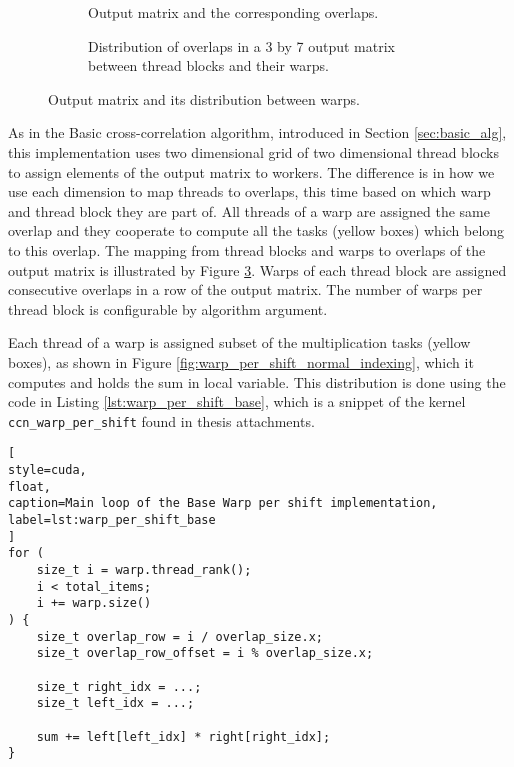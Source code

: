 \begin{figure}[ht]
	\centering	
	\begin{subfigure}{0.55\textwidth}
		\fontsize{6}{8}\selectfont
		\centering
		\def\svgwidth{\textwidth}
		
		\caption{Output matrix and the corresponding overlaps.}
		\label{fig:warp_per_shift_overlaps}
	\end{subfigure}
	\hfill
	\begin{subfigure}{0.4\textwidth}
		\centering
		\def\svgwidth{\textwidth}
		\fontsize{6}{8}\selectfont
		
		\caption{Distribution of overlaps in a 3 by 7 output matrix between thread blocks and their warps.}
		\label{fig:warp_per_shift_warps}
	\end{subfigure}
	
	\caption{Output matrix and its distribution between warps.}
\end{figure}

As in the Basic cross-correlation algorithm, introduced in Section \ref{sec:basic_alg}, this implementation uses two dimensional grid of two dimensional thread blocks to assign elements of the output matrix to workers. The difference is in how we use each dimension to map threads to overlaps, this time based on which warp and thread block they are part of. All threads of a warp are assigned the same overlap and they cooperate to compute all the tasks (yellow boxes) which belong to this overlap. The mapping from thread blocks and warps to overlaps of the output matrix is illustrated by Figure \ref{fig:warp_per_shift_warps}. Warps of each thread block are assigned consecutive overlaps in a row of the output matrix. The number of warps per thread block is configurable by algorithm argument.

Each thread of a warp is assigned subset of the multiplication tasks (yellow boxes), as shown in Figure \ref{fig:warp_per_shift_normal_indexing}, which it computes and holds the sum in local variable. This distribution is done using the code in Listing \ref{lst:warp_per_shift_base}, which is a snippet of the kernel \texttt{ccn\_warp\_per\_shift} found  in thesis attachments.

\begin{lstlisting}[
style=cuda,
float,
caption=Main loop of the Base Warp per shift implementation,
label=lst:warp_per_shift_base
]
for (
	size_t i = warp.thread_rank(); 
	i < total_items; 
	i += warp.size()
) {
	size_t overlap_row = i / overlap_size.x;
	size_t overlap_row_offset = i % overlap_size.x;

	size_t right_idx = ...;
	size_t left_idx = ...;

	sum += left[left_idx] * right[right_idx];
}
\end{lstlisting}

